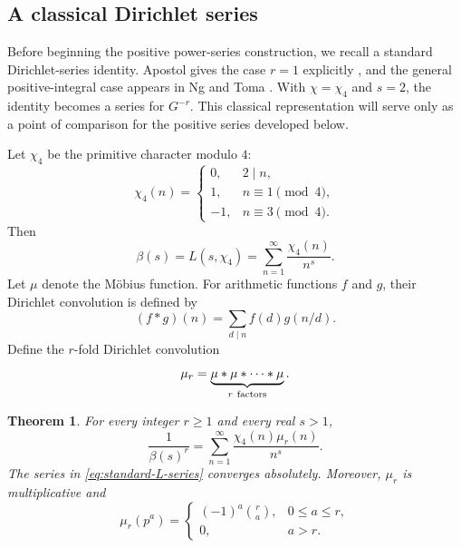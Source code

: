 \documentclass[11pt,reqno]{amsart}
\numberwithin{equation}{section}
\newtheorem{theorem}{Theorem}[section]
\theoremstyle{definition}
\theoremstyle{remark}
\newcommand{\Gconst}{G}
\begin{document}
\subsection{A classical Dirichlet series}

Before beginning the positive power-series construction, we recall a
standard Dirichlet-series identity.  Apostol gives the case \(r=1\)
explicitly \cite[\S11.4, Example~3]{Apostol1976}, and the general
positive-integral case appears in Ng and Toma
\cite[Eq.~(5.3)]{NgToma2024}.  With \(\chi=\chi_4\) and \(s=2\), the
identity becomes a series for \(\Gconst^{-r}\).  This classical
representation will serve only as a point of comparison for the
positive series developed below.

Let \(\chi_4\) be the primitive character modulo \(4\):
\begin{equation}\label{eq:chi4}
 \chi_4(n)=
 \begin{cases}
   0,&2\mid n,\\
   1,&n\equiv1\pmod4,\\
  -1,&n\equiv3\pmod4.
 \end{cases}
\end{equation}
Then
\[
 \beta(s)=L(s,\chi_4)
 =\sum_{n=1}^{\infty}\frac{\chi_4(n)}{n^s}.
\]
Let \(\mu\) denote the M\"obius function.  For arithmetic functions
\(f\) and \(g\), their Dirichlet convolution is defined by
\[
 (f*g)(n)=\sum_{d\mid n}f(d)g(n/d).
\]
Define the \(r\)-fold Dirichlet convolution
\begin{equation}\label{eq:mu-r}
 \mu_r=\underbrace{\mu*\mu*\cdots *\mu}_{r\ {\rm factors}}.
\end{equation}

\begin{theorem}
\label{thm:standard-L}
For every integer \(r\geq1\) and every real \(s>1\),
\begin{equation}\label{eq:standard-L-series}
 \frac1{\beta(s)^r}
 =\sum_{n=1}^{\infty}\frac{\chi_4(n)\mu_r(n)}{n^s}.
\end{equation}
The series in \eqref{eq:standard-L-series} converges absolutely.
Moreover, \(\mu_r\) is multiplicative and
\begin{equation}\label{eq:mu-r-prime}
 \mu_r(p^a)=
 \begin{cases}
  (-1)^a\binom{r}{a},&0\leq a\leq r,\\
  0,&a>r.
 \end{cases}
\end{equation}
\end{theorem}
\end{document}

